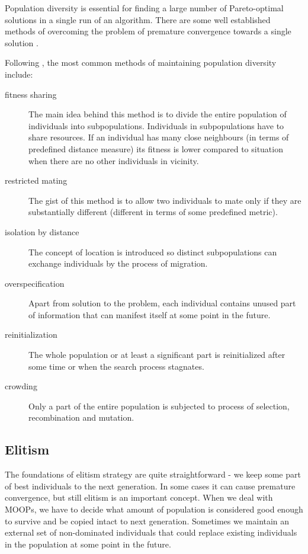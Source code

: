 Population diversity is essential for finding a large number of Pareto-optimal solutions in a single run of an algorithm.
There are some well established methods of overcoming the problem of premature convergence towards a single solution \cite{Phd}. 

Following \cite{Phd}, the most common methods of maintaining population diversity include:

\begin{description}
  \item [fitness sharing]
	The main idea behind this method is to divide the entire population of individuals into subpopulations.
	Individuals in subpopulations have to share resources.
	If an individual has many close neighbours (in terms of predefined distance measure) its fitness is lower compared to situation when there are
	no other individuals in vicinity. 
	
  \item [restricted mating]
	The gist of this method is to allow two individuals to mate only if they are substantially different (different in terms of some predefined metric).
  \item [isolation by distance]
	The concept of location is introduced so distinct subpopulations can exchange individuals by the process of migration. 
  \item [overspecification]
	Apart from solution to the problem, each individual contains unused part of information that can manifest itself at some point in the future.
  \item [reinitialization]
	The whole population or at least a significant part is reinitialized after some time or when the search process stagnates.
  \item [crowding]
	Only a part of the entire population is subjected to process of selection, recombination and mutation. 
\end{description}


\subsection{Elitism}

The foundations of elitism strategy are quite straightforward - we keep some part of best individuals to the next generation.
In some cases it can cause premature convergence, but still elitism is an important concept.
When we deal with MOOPs, we have to decide what amount of population is considered good enough to survive and be copied intact to next generation.
Sometimes we maintain an external set of non-dominated individuals that could replace existing individuals in the population at some point in the future.
   
